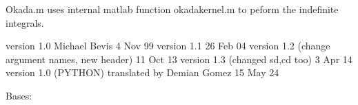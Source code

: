 \documentclass[letterpaper,10pt,english]{sphinxmanual}
\begin{document}
\sphinxAtStartPar
Okada.m uses internal matlab function okadakernel.m to peform the indefinite integrals.

\sphinxAtStartPar
version 1.0               Michael Bevis                  4 Nov 99
version 1.1                                             26 Feb 04
version 1.2  (change argument names, new header)        11 Oct 13
version 1.3  (changed sd,cd too)                         3 Apr 14
version 1.0  (PYTHON) translated by Demian Gomez        15 May 24

\begin{fulllineitems}
\label{\detokenize{pgamit.classes:pgamit.classes.pyOkada.Score}}
\pysigstartsignatures
\pysiglinewithargsret
{}
{\sphinxparamcomma {}\sphinxparamcomma {}\sphinxparamcomma {}\sphinxparamcomma {}\sphinxparamcomma {}\sphinxparamcomma {}\sphinxparamcomma {}}
{}
\pysigstopsignatures
\sphinxAtStartPar
Bases: 

\begin{fulllineitems}
\label{\detokenize{pgamit.classes:pgamit.classes.pyOkada.Score.compute_disp_field}}
\pysigstartsignatures
\pysiglinewithargsret
{}
{\sphinxparamcomma {}}
{}
\pysigstopsignatures
\end{fulllineitems}


\begin{fulllineitems}
\label{\detokenize{pgamit.classes:pgamit.classes.pyOkada.Score.save_mask}}
\pysigstartsignatures
\pysiglinewithargsret
{}
{}
{}
\pysigstopsignatures
\end{fulllineitems}


\end{fulllineitems}
\end{document}
